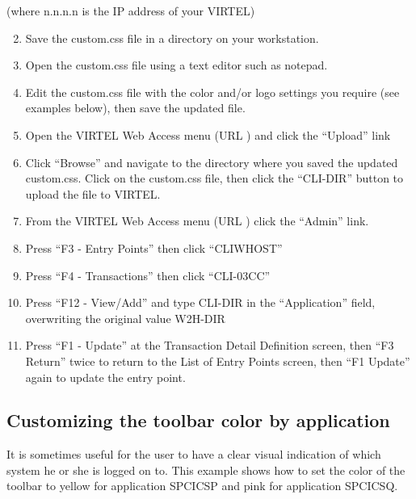 \documentclass[letterpaper,10pt,english]{sphinxmanual}
\begin{document}
(where n.n.n.n is the IP address of your VIRTEL)
\begin{enumerate}
\setcounter{enumi}{1}
\item {} 
Save the custom.css file in a directory on your workstation.

\item {} 
Open the custom.css file using a text editor such as notepad.

\item {} 
Edit the custom.css file with the color and/or logo settings you require (see examples below), then save the updated file.

\item {} 
Open the VIRTEL Web Access menu (URL ) and click the “Upload” link

\item {} 
Click “Browse” and navigate to the directory where you saved the updated custom.css. Click on the custom.css file, then click the “CLI-DIR” button to upload the file to VIRTEL.

\item {} 
From the VIRTEL Web Access menu (URL ) click the “Admin” link.

\item {} 
Press “F3 - Entry Points” then click “CLIWHOST”

\item {} 
Press “F4 - Transactions” then click “CLI-03CC”

\item {} 
Press “F12 - View/Add” and type CLI-DIR in the “Application” field, overwriting the original value W2H-DIR

\item {} 
Press “F1 - Update” at the Transaction Detail Definition screen, then “F3 \textendash{} Return” twice to return to the List of Entry Points screen, then “F1 \textendash{} Update” again to update the entry point.

\end{enumerate}


\subsection{Customizing the toolbar color by application}
\label{\detokenize{User_Guide:customizing-the-toolbar-color-by-application}}
It is sometimes useful for the user to have a clear visual indication of which system he or she is logged on to. This example shows how to set the color of the toolbar to yellow for application SPCICSP and pink for application SPCICSQ.
\end{document}
